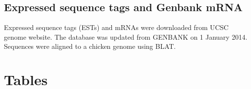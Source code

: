 \documentclass[10pt]{article}
\begin{document}
\subsection*{Expressed sequence tags and Genbank mRNA}
Expressed sequence tags (ESTs) and mRNAs were downloaded from UCSC genome
website.  The database was updated from GENBANK on 1 January 2014.  Sequences
were aligned to a chicken genome using BLAT.



\section*{Tables}
\end{document}
